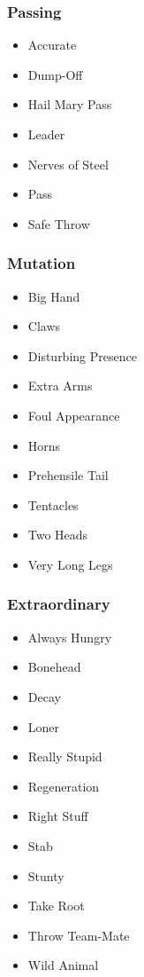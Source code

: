 \documentclass{article}
\begin{document}
\begin{multicols}{3}
\begin{samepage}
\subsubsection{Passing}
\begin{itemize}
\item[] Accurate
\item[] Dump-Off
\item[] Hail Mary Pass
\item[] Leader
\item[] Nerves of Steel
\item[] Pass
\item[] Safe Throw
\end{itemize}
\end{samepage}

\columnbreak

\begin{samepage}
\subsubsection{Mutation}
\begin{itemize}
\item[] Big Hand
\item[] Claws
\item[] Disturbing Presence
\item[] Extra Arms
\item[] Foul Appearance
\item[] Horns
\item[] Prehensile Tail
\item[] Tentacles
\item[] Two Heads
\item[] Very Long Legs
\end{itemize}
\end{samepage}

\begin{samepage}
\subsubsection{Extraordinary}
\begin{itemize}
\item[] Always Hungry
\item[] Bonehead
\item[] Decay
\item[] Loner
\item[] Really Stupid
\item[] Regeneration
\item[] Right Stuff
\item[] Stab
\item[] Stunty
\item[] Take Root
\item[] Throw Team-Mate
\item[] Wild Animal
\end{itemize}
\end{samepage}

\end{multicols}
\end{document}
